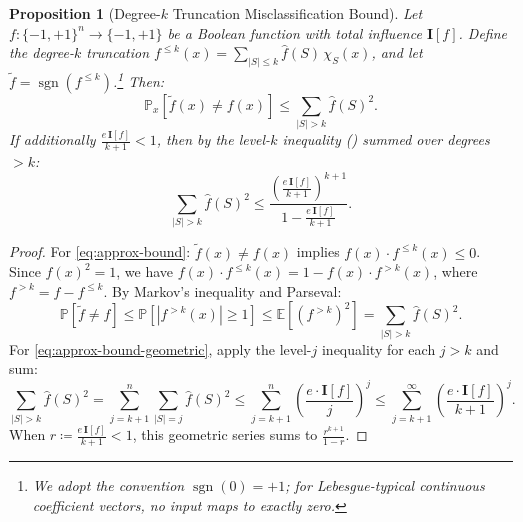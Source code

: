 \documentclass[12pt,a4paper]{article}
\theoremstyle{plain}
\newtheorem{proposition}[theorem]{Proposition}
\theoremstyle{definition}
\theoremstyle{remark}
\newcommand{\E}{\mathbb{E}}
\newcommand{\Prob}{\mathbb{P}}
\newcommand{\pmone}{\{-1,+1\}}
\newcommand{\fhat}{\widehat{f}}
\newcommand{\sgn}{\operatorname{sgn}}
\begin{document}
\begin{proposition}[Degree-$k$ Truncation Misclassification Bound]\label{thm:approx-bound}
Let $f \colon \pmone^n \to \pmone$ be a Boolean function with total influence $\mathbf{I}[f]$. Define the degree-$k$ truncation $f^{\leq k}(x) = \sum_{|S| \leq k} \fhat(S)\, \chi_S(x)$, and let $\tilde{f} = \sgn(f^{\leq k})$.\footnote{We adopt the convention $\sgn(0) = +1$; for Lebesgue-typical continuous coefficient vectors, no input maps to exactly zero.} Then:
\begin{equation}\label{eq:approx-bound}
    \Prob_x[\tilde{f}(x) \neq f(x)] \leq \sum_{|S| > k} \fhat(S)^2.
\end{equation}
If additionally $\frac{e\,\mathbf{I}[f]}{k+1} < 1$, then by the level-$k$ inequality () summed over degrees $> k$:
\begin{equation}\label{eq:approx-bound-geometric}
    \sum_{|S| > k} \fhat(S)^2 \leq \frac{\left(\frac{e\,\mathbf{I}[f]}{k+1}\right)^{k+1}}{1 - \frac{e\,\mathbf{I}[f]}{k+1}}.
\end{equation}
\end{proposition}

\begin{proof}
For \eqref{eq:approx-bound}: $\tilde{f}(x) \neq f(x)$ implies $f(x) \cdot f^{\leq k}(x) \leq 0$. Since $f(x)^2 = 1$, we have $f(x) \cdot f^{\leq k}(x) = 1 - f(x) \cdot f^{>k}(x)$, where $f^{>k} = f - f^{\leq k}$. By Markov's inequality and Parseval:
\[
\Prob[\tilde{f} \neq f] \leq \Prob[|f^{>k}(x)| \geq 1] \leq \E[(f^{>k})^2] = \sum_{|S|>k} \fhat(S)^2.
\]
For \eqref{eq:approx-bound-geometric}, apply the level-$j$ inequality for each $j > k$ and sum:
\[
\sum_{|S|>k} \fhat(S)^2 = \sum_{j=k+1}^{n} \sum_{|S|=j} \fhat(S)^2 \leq \sum_{j=k+1}^{n} \left(\frac{e \cdot \mathbf{I}[f]}{j}\right)^j \leq \sum_{j=k+1}^{\infty} \left(\frac{e \cdot \mathbf{I}[f]}{k+1}\right)^j.
\]
When $r \coloneqq \frac{e\,\mathbf{I}[f]}{k+1} < 1$, this geometric series sums to $\frac{r^{k+1}}{1-r}$.
\end{proof}
\end{document}
